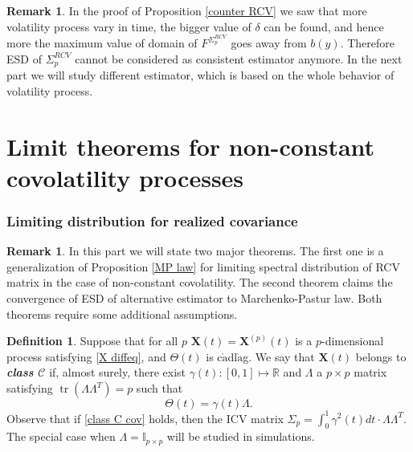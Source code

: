\documentclass[a4paper,11pt]{article}
\theoremstyle{plain}
\theoremstyle{definition}
\newtheorem{defn}[thm]{Definition}
\newtheorem{rmrk}[thm]{Remark}
\newcommand{\MR}{\mathbb{R}}
\newcommand{\tr}{\operatorname{tr}}
\newcommand{\define}[1]{\textit{\textbf{#1}}}
\begin{document}
    \begin{rmrk}
    	In the proof of Proposition \ref{counter RCV} we saw that more volatility process vary in time, the bigger value of $\delta$ can be found, and hence more the maximum value of domain of $F^{\Sigma_p^{RCV}}$ goes away from $b(y)$. Therefore ESD of $\Sigma_p^{RCV}$ cannot be considered as consistent estimator anymore. In the next part we will study different estimator, which is based on the whole behavior of volatility process.
    \end{rmrk}
    
    \pagebreak
    \part{Limit theorems for non-constant covolatility processes}
    
    \section*{Limiting distribution for realized covariance}
    \begin{rmrk}
    	In this part we will state two major theorems. The first one is a generalization of Proposition \ref{MP law} for limiting spectral distribution of RCV matrix in the case of non-constant covolatility. The second theorem claims the convergence of ESD of alternative estimator to Marchenko-Pastur law. Both theorems require some additional assumptions.
    \end{rmrk}
    
    
    \begin{defn}
    	Suppose that for all $p$ $\mathbf{X}(t) = \mathbf{X}^{(p)}(t)$ is a $p$-dimensional process satisfying \eqref{X diffeq}, and $\Theta(t)$ is c$\grave{\text{a}}$dl$\grave{\text{a}}$g. We say that $\mathbf{X}(t)$ belongs to \define{class $\mathcal{C}$} if, almost surely, there exist $\gamma(t): [0, 1] \mapsto \MR$ and $\Lambda$ a $p \times p$ matrix satisfying $\tr(\Lambda \Lambda^T) = p$ such that 
    	\begin{equation} \label{class C cov}
    	\Theta(t) = \gamma(t) \Lambda.
    	\end{equation}
    	Observe that if \eqref{class C cov} holds, then the ICV matrix $\Sigma_p = \int_{0}^{1} \gamma^2(t) dt \cdot \Lambda \Lambda^T$. The special case when $\Lambda = \mathbb{I}_{p \times p}$ will be studied in simulations.
    \end{defn}
    
\end{document}
